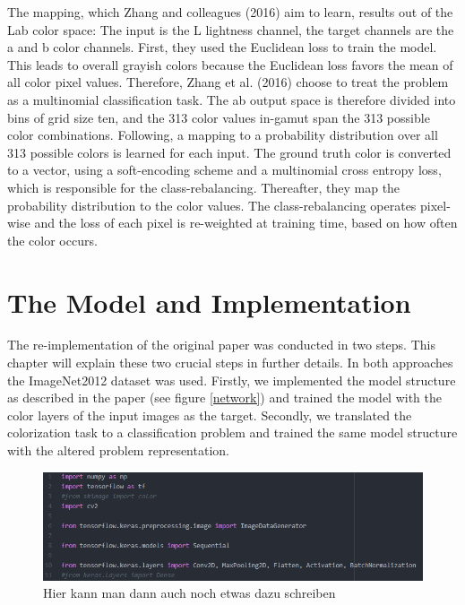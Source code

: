 \documentclass[12pt,letterpaper]{article}
\begin{document}
The mapping, which Zhang and colleagues (2016) aim to learn, results out of the  Lab color space: The input is the L lightness channel, the target channels are the a and b color channels. First, they used the Euclidean loss to train the model. This leads to overall grayish colors because the Euclidean loss favors the mean of all color pixel values. Therefore, Zhang et al. (2016) choose to treat the problem as a multinomial classification task. The ab output space is therefore divided into bins of grid size ten, and the 313 color values in-gamut span the 313 possible color combinations. Following, a mapping to a probability distribution over all 313 possible colors is learned for each input. The ground truth color is converted to a vector, using a soft-encoding scheme and a multinomial cross entropy loss, which is responsible for the class-rebalancing. Thereafter, they map the probability distribution to the color values. The class-rebalancing operates pixel-wise and the loss of each pixel is re-weighted at training time, based on how often the color occurs.

\section{The Model and Implementation}
The re-implementation of the original paper \citep{Zhang.2016} was conducted in two steps. This chapter will explain these two crucial steps in further details. In both approaches the ImageNet2012 dataset was used. Firstly, we implemented the model structure as described in the paper (see figure \ref{network}) and trained the model with the color layers of the input images as the target. Secondly, we translated the colorization task to a classification problem and trained the same model structure with the altered problem representation.

\begin{figure}[ht]
	\centering
	\includegraphics[width=1.0\textwidth]{bsp.png}
	\caption{Hier kann man dann auch noch etwas dazu schreiben}
	\label{bsp}
\end{figure}

\end{document}
